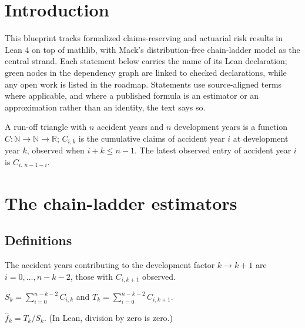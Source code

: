 
\chapter{Introduction}

This blueprint tracks formalized claims-reserving and actuarial risk results in Lean 4 on top
of mathlib, with Mack's distribution-free chain-ladder model \cite{Mack1993} as the central
strand. Each statement below carries the name of its
Lean declaration; green nodes in the dependency graph are linked to checked declarations,
while any open work is listed in the roadmap. Statements use source-aligned terms where applicable, and where a published
formula is an estimator or an approximation rather than an identity, the text says so.

A run-off triangle with $n$ accident years and $n$ development years is a function
$C : \mathbb{N} \to \mathbb{N} \to \mathbb{R}$; $C_{i,k}$ is the cumulative claims of accident
year $i$ at development year $k$, observed when $i + k \le n-1$. The latest observed entry of
accident year $i$ is $C_{i,\,n-1-i}$.

\chapter{The chain-ladder estimators}

\section{Definitions}

\begin{definition}[Contributors]\label{def:contributors}\leanok
The accident years contributing to the development factor $k \to k+1$ are
$i = 0, \dots, n-k-2$, those with $C_{i,k+1}$ observed.
\end{definition}

\begin{definition}\label{def:S}\leanok
{}
$S_k = \sum_{i=0}^{n-k-2} C_{i,k}$ and $T_k = \sum_{i=0}^{n-k-2} C_{i,k+1}$.
\end{definition}

\begin{definition}\label{def:fhat}\leanok
{}
$\hat f_k = T_k / S_k$. (In Lean, division by zero is zero.)
\end{definition}

